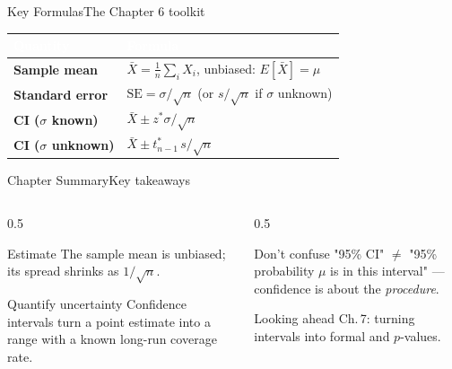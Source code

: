 \documentclass[aspectratio=169,11pt]{beamer}
\begin{document}
\begin{frame}{Key Formulas}{The Chapter 6 toolkit}
  \small
  \renewcommand{\arraystretch}{1.3}
  \begin{center}
  \begin{tabularx}{\textwidth}{@{}>{\bfseries}l >{\raggedright\arraybackslash}X@{}}
    \toprule
    \rowcolor{PrimaryDark}
    \textcolor{white}{Quantity} & \textcolor{white}{Formula} \\
    \midrule
    Sample mean & $\bar X = \frac1n\sum_i X_i$, unbiased: $E[\bar X]=\mu$ \\
    \rowcolor{PrimaryLight!25}
    Standard error & $\text{SE} = \sigma/\sqrt n$ (or $s/\sqrt n$ if $\sigma$ unknown) \\
    CI ($\sigma$ known) & $\bar X \pm z^\ast \sigma/\sqrt n$ \\
    \rowcolor{PrimaryLight!25}
    CI ($\sigma$ unknown) & $\bar X \pm t^\ast_{n-1}\, s/\sqrt n$ \\
    \bottomrule
  \end{tabularx}
  \end{center}
\end{frame}

\begin{frame}{Chapter Summary}{Key takeaways}
  \begin{columns}[T]
    \begin{column}{0.5\textwidth}
      \begin{block}{Estimate}
        \small The sample mean is unbiased; its spread shrinks as
        $1/\sqrt n$.
      \end{block}
      \begin{exampleblock}{Quantify uncertainty}
        \small Confidence intervals turn a point estimate into a range
        with a known long-run coverage rate.
      \end{exampleblock}
    \end{column}
    \begin{column}{0.5\textwidth}
      \begin{alertblock}{Don't confuse}
        \small "95\% CI" $\ne$ "95\% probability $\mu$ is in this
        interval" — confidence is about the \emph{procedure}.
      \end{alertblock}
      \begin{block}{Looking ahead}
        \small Ch.\,7: turning intervals into formal
         and $p$-values.
      \end{block}
    \end{column}
  \end{columns}
\end{frame}
\end{document}
